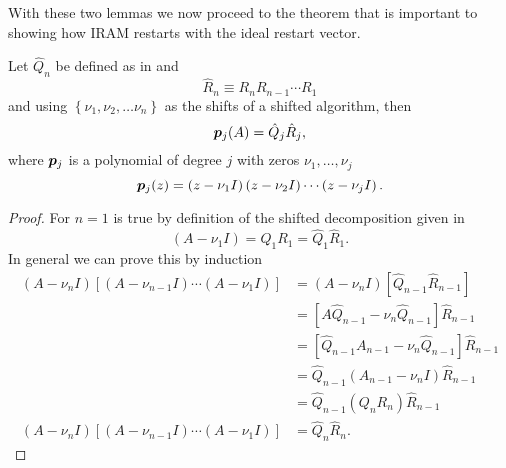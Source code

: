 With these two lemmas we now proceed to the theorem that is important to showing how IRAM restarts with the ideal restart vector.
\begin{thm} \label{thm:QRPolynomial}
    Let $\hat{Q}_n$ be defined as in  and
    \begin{equation}
        \hat{R}_n \equiv R_nR_{n-1}\cdots R_1
        \label{eq:RhatDefined}
    \end{equation}
    and using $\left\{\nu_1,\nu_2,\ldots\nu_n\right\}$ as the shifts of a shifted \QR algorithm, then
\begin{equation}
    \bm{p}_j(A) = \hat{Q}_j\hat{R}_j,
    \label{eq:QRPolynomial}
\end{equation}
    where $\bm{p}_j$ is a polynomial of degree $j$ with zeros $\nu_1,\ldots,\nu_j$
    \begin{equation}
        \bm{p}_j(z) = \left(z-\nu_1I\right)\left(z-\nu_2I\right)\cdots\left(z-\nu_jI\right).
        \label{eq:Polynomial}
    \end{equation}
\end{thm}
\begin{proof}
    For $n=1$  is true by definition of the shifted \QR decomposition given in 
    \begin{equation}
        \left(A - \nu_1I\right) = Q_1R_1 = \hat{Q}_1\hat{R}_1.
    \end{equation}
    In general we can prove this by induction
    \begin{equation}
        \begin{split}
            \left(A-\nu_nI\right)\left[\left(A-\nu_{n-1}I\right)\cdots\left(A-\nu_1I\right)\right] &= \left(A-\nu_nI\right)\left[\hat{Q}_{n-1}\hat{R}_{n-1}\right] \\
            &=\left[A\hat{Q}_{n-1} - \nu_n\hat{Q}_{n-1}\right]\hat{R}_{n-1} \\
            &=\left[\hat{Q}_{n-1}A_{n-1} - \nu_n\hat{Q}_{n-1}\right]\hat{R}_{n-1} \\
            &=\hat{Q}_{n-1}\left(A_{n-1} - \nu_nI\right)\hat{R}_{n-1} \\
            &=\hat{Q}_{n-1}\left(Q_nR_n\right)\hat{R}_{n-1} \\
            \left(A-\nu_nI\right)\left[\left(A-\nu_{n-1}I\right)\cdots\left(A-\nu_1I\right)\right] &=\hat{Q}_n\hat{R}_n.
        \end{split}
    \end{equation}
\end{proof}

